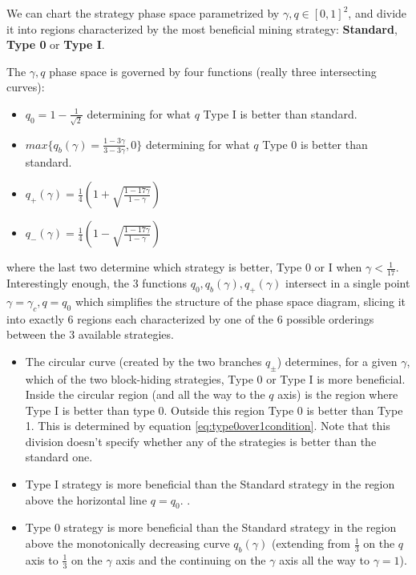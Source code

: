 \documentclass[letterpaper,12pt]{report}
\theoremstyle{plain}
\theoremstyle{definition}
\begin{document}
We can chart the strategy phase space parametrized by $\gamma,q\in [0,1]^2$, and divide it into regions characterized by the most beneficial mining strategy: \textbf{Standard}, \textbf{Type 0} or \textbf{Type I}.

The $\gamma, q$ phase space is governed by four functions (really three intersecting curves):
\begin{itemize}
\item $q_0= 1-\frac{1}{\sqrt{2}}$ determining for what $q$ Type I is better than standard.
\item $max\lbrace q_b(\gamma)=\frac{1-3\gamma}{3-3\gamma},0\rbrace$ determining for what $q$ Type 0 is better than standard.
\item $q_+(\gamma)=\frac{1}{4}\left(1+\sqrt{\frac{1-17\gamma}{1-\gamma}}\right)$ 
\item $q_-(\gamma)=\frac{1}{4}\left(1-\sqrt{\frac{1-17\gamma}{1-\gamma}}\right)$
\end{itemize}
where the last two determine which strategy is better, Type 0 or I when $\gamma<\frac{1}{17}$.
Interestingly enough, the 3 functions $q_0, q_b(\gamma), q_+(\gamma)$ intersect in a single point $\gamma=\gamma_c, q=q_0$ which simplifies the structure of the phase space diagram, slicing it into exactly 6 regions each characterized by one of the 6 possible orderings between the 3 available strategies.

\begin{itemize}
\item The circular curve (created by the two branches $q_{\pm}$) determines, for a given $\gamma$, which of the two block-hiding strategies, Type 0 or Type I is more beneficial. Inside the circular region (and all the way to the $q$ axis) is the region where Type I is better than type 0. Outside this region Type 0 is better than Type 1. This is determined by equation \ref{eq:type0over1condition}. Note that this division doesn't specify whether any of the strategies is better than the standard one.
\item Type I strategy is more beneficial than the Standard strategy in the region above the horizontal line $q=q_0$. .
\item Type 0 strategy is more beneficial than the Standard strategy in the region above the monotonically decreasing curve $q_b(\gamma)$ (extending from $\frac{1}{3}$ on the $q$ axis to $\frac{1}{3}$ on the $\gamma$ axis and the continuing on the $\gamma$ axis all the way to $\gamma=1$).
\end{itemize}
\end{document}
